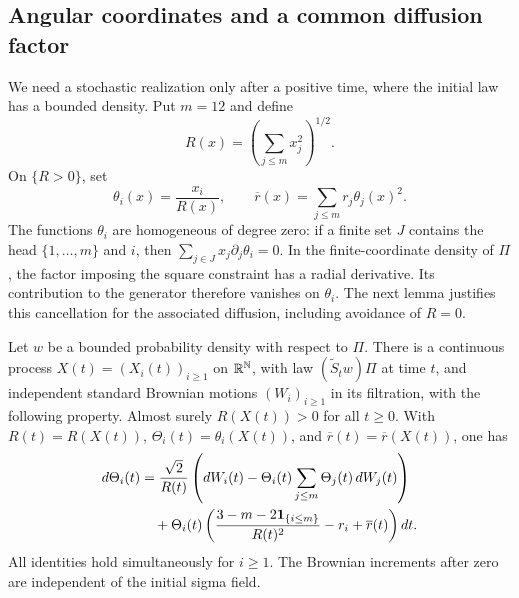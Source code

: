 \subsection{Angular coordinates and a common diffusion factor}

We need a stochastic realization only after a positive time, where the
initial law has a bounded density.  Put \(m=12\) and define
\[
 R(x)=\left(\sum_{j\le m}x_j^2\right)^{1/2}.
\]
On \(\{R>0\}\), set
\[
 \theta_i(x)=\frac{x_i}{R(x)},\qquad
 \overline r(x)=\sum_{j\le m}r_j\theta_j(x)^2 .
\]
The functions \(\theta_i\) are homogeneous of degree zero: if a finite
set \(J\) contains the head \(\{1,\ldots,m\}\) and \(i\), then
\(\sum_{j\in J}x_j\partial_j\theta_i=0\).
In the finite-coordinate density of \(\Pi\), the factor imposing the
square constraint has a radial derivative.  Its contribution to the
generator therefore vanishes on \(\theta_i\).  The next lemma justifies
this cancellation for the associated diffusion, including avoidance
of \(R=0\).

\begin{lemma}\label{entr:angular-realization}
Let \(w\) be a bounded probability density with respect to \(\Pi\).
There is a continuous process \(X(t)=(X_i(t))_{i\ge1}\) on
\(\mathbb R^\mathbb N\), with law \((\widetilde S_t w)\Pi\) at time \(t\), and
independent standard Brownian motions \((W_i)_{i\ge1}\) in its filtration,
with the following property.  Almost surely \(R(X(t))>0\) for all
\(t\ge0\).  With \(R(t)=R(X(t))\),
\(\Theta_i(t)=\theta_i(X(t))\), and
\(\overline r(t)=\overline r(X(t))\), one has
\begin{align}
 d\Theta_i(t)
 &=
 \frac{\sqrt2}{R(t)}
 \left(dW_i(t)-\Theta_i(t)\sum_{j\le m}\Theta_j(t)\,dW_j(t)\right)
 \notag\\
 &\quad+
 \Theta_i(t)\left(
  \frac{3-m-2\mathbf 1_{\{i\le m\}}}{R(t)^2}-r_i+\overline r(t)
 \right)dt .                                      \label{entr:angular-sde}
\end{align}
All identities hold simultaneously for \(i\ge1\).  The Brownian
increments after zero are independent of the initial sigma field.
\end{lemma}

